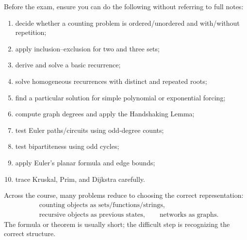 \begin{examtip}[title={Final pre-exam checklist}]
Before the exam, ensure you can do the following without referring to full notes:
\begin{enumerate}[leftmargin=*]
    \item decide whether a counting problem is ordered/unordered and with/without repetition;
    \item apply inclusion--exclusion for two and three sets;
    \item derive and solve a basic recurrence;
    \item solve homogeneous recurrences with distinct and repeated roots;
    \item find a particular solution for simple polynomial or exponential forcing;
    \item compute graph degrees and apply the Handshaking Lemma;
    \item test Euler paths/circuits using odd-degree counts;
    \item test bipartiteness using odd cycles;
    \item apply Euler's planar formula and edge bounds;
    \item trace Kruskal, Prim, and Dijkstra carefully.
\end{enumerate}
\end{examtip}

\begin{extension}[title={One unifying theme}]
Across the course, many problems reduce to choosing the correct representation:
\[
\begin{aligned}
&\text{counting objects as sets/functions/strings},\\
&\text{recursive objects as previous states},\qquad
\text{networks as graphs}.
\end{aligned}
\]
The formula or theorem is usually short; the difficult step is recognizing the correct structure.
\end{extension}
